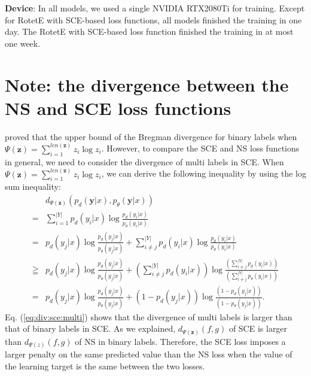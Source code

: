 \noindent\textbf{Device}: In all models, we used a single NVIDIA RTX2080Ti for training. Except for RotetE with SCE-based loss functions, all models finished the training in one day.
The RotetE with SCE-based loss function finished the training in at most one week.

\clearpage
\section{Note: the divergence between the NS and SCE loss functions}
\label{app:proof:bound}
\citet{8930624} proved that the upper bound of the Bregman divergence for binary labels when $\Psi(\mathbf{z})=\sum_{i=1}^{len(\mathbf{z})}z_{i}\log{z_{i}}$. However, to compare the SCE and NS loss functions in general, we need to consider the divergence of multi labels in SCE.
When $\Psi(\mathbf{z})=\sum_{i=1}^{len(\mathbf{z})}z_{i}\log{z_{i}}$, we can derive the following inequality by using the log sum inequality:
\begin{align}
     &d_{\Psi(\mathbf{z})}(p_{d}(\mathbf{y}|x),p_{\theta}(\mathbf{y}|x)) \nonumber\\
     =& \sum_{i=1}^{|Y|} p_{d}(y_{i}|x)\log\frac{p_{d}(y_{i}|x)}{p_{\theta}(y_{i}|x)} \nonumber\\
     =& p_{d}(y_{j}|x)\log\frac{p_{d}(y_{j}|x)}{p_{\theta}(y_{j}|x)} + \sum_{i \not = j}^{|Y|} p_{d}(y_{i}|x)\log\frac{p_{d}(y_{i}|x)}{p_{\theta}(y_{i}|x)}\nonumber\\
     \geqq & p_{d}(y_{j}|x)\log\frac{p_{d}(y_{j}|x)}{p_{\theta}(y_{j}|x)}  + (\sum_{i \not = j}^{|Y|} p_{d}(y_{i}|x))\log\frac{(\sum_{i \not = j}^{|Y|} p_{d}(y_{i}|x))}{(\sum_{i \not = j}^{|Y|} p_{\theta}(y_{i}|x))} \nonumber\\
     =& p_{d}(y_{j}|x)\log\frac{p_{d}(y_{j}|x)}{p_{\theta}(y_{j}|x)} + (1- p_{d}(y_{j}|x))\log\frac{(1 - p_{d}(y_{j}|x))}{(1 - p_{\theta}(y_{j}|x))}.
     \label{eq:div:sce:multi}
\end{align}
Eq. (\ref{eq:div:sce:multi}) shows that the divergence of multi labels is larger than that of binary labels in SCE.
As we explained, $d_{\Psi(\mathbf{z})}(f,g)$ of SCE is larger than $d_{\Psi(z)}(f,g)$ of NS in binary labels.
Therefore, the SCE loss imposes a larger penalty on the same predicted value than the NS loss when the value of the learning target is the same between the two losses.